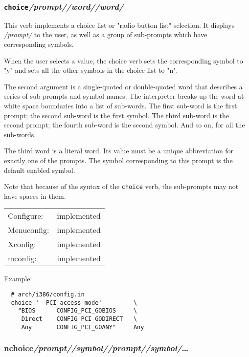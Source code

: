 \subsubsection{\texttt{choice}\quad \textit{/prompt/}\quad\textit{/word/}\quad\textit{/word/}}

This verb implements a choice list or "radio button list" selection.
It displays \textit{/prompt/} to the user, as well as a group of sub-prompts
which have corresponding symbols.

When the user selects a value, the choice verb sets the corresponding
symbol to "y" and sets all the other symbols in the choice list to "n".

The second argument is a single-quoted or double-quoted word that
describes a series of sub-prompts and symbol names.  The interpreter
breaks up the word at white space boundaries into a list of sub-words.
The first sub-word is the first prompt; the second sub-word is the
first symbol.  The third sub-word is the second prompt; the fourth
sub-word is the second symbol.  And so on, for all the sub-words.

The third word is a literal word.  Its value must be a unique abbreviation
for exactly one of the prompts.  The symbol corresponding to this prompt
is the default enabled symbol.

Note that because of the syntax of the \texttt{choice} verb, the sub-prompts
may not have spaces in them.

\begin{tabular}{ll}
Configure:  &implemented\\
Menuconfig: &implemented\\
Xconfig:    &implemented\\
mconfig:    &implemented\\
\end{tabular}

Example:
{\small\begin{verbatim}
  # arch/i386/config.in
  choice '  PCI access mode'         \
    "BIOS      CONFIG_PCI_GOBIOS     \
     Direct    CONFIG_PCI_GODIRECT   \
     Any       CONFIG_PCI_GOANY"     Any
\end{verbatim}}



\subsubsection{nchoice\quad \textit{/prompt/}\quad\textit{/symbol/}\quad\textit{/prompt/}\quad\textit{/symbol/}\dots}

